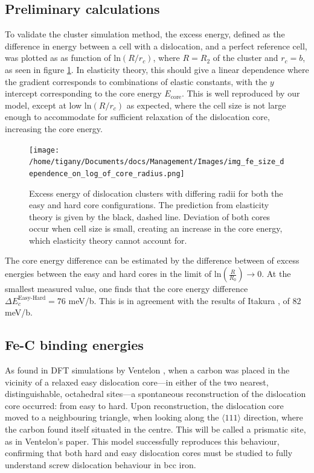\documentclass[a4paper,11pt]{article}
\begin{document}
\subsection{Preliminary calculations}
\label{sec:org8fcfa8a}


To validate the cluster simulation method, the excess energy, defined as the difference in energy
between a cell with a dislocation, and a perfect reference cell, was plotted as as function of
\(\text{ln}(R/r_c)\), where \(R = R_2\) of the cluster and \(r_c = b\), as seen in
figure \ref{lnrdep}. In elasticity theory, this should give a linear dependence where the gradient
corresponds to combinations of elastic constants, with the \(y\) intercept corresponding to the
core energy \(E_{\text{core}}\). This is well reproduced by our model, except at low \(\text{ln}(R/r_c)\)
as expected, where the cell size is not large enough to accommodate for sufficient relaxation of
the dislocation core, increasing the core energy.


\begin{figure}[htbp]
\centering
\texttt{[image: /home/tigany/Documents/docs/Management/Images/img\_fe\_size\_dependence\_on\_log\_of\_core\_radius.png]}
\caption{Excess energy of dislocation clusters with differing radii for both the easy and hard core configurations. The prediction from elasticity theory is given by the black, dashed line. Deviation of both cores occur when cell size is small, creating an increase in the core energy, which elasticity theory cannot account for. \label{lnrdep}}
\end{figure}




The core energy difference can be estimated by the difference between of excess energies between
the easy and hard cores in the limit of \(\text{ln}(\frac{R}{R_0}) \rightarrow 0\). At the smallest measured
value, one finds that the core energy difference \(\Delta E_c^{\text{Easy-Hard}} = 76\) meV/b. This is in
agreement with the results of Itakura \cite{Itakura2012}, of 82 meV/b.



\subsection{Fe-C binding energies}
\label{sec:org6067331}



As found in DFT simulations by Ventelon \cite{Ventelon2015}, when a carbon was placed in the
vicinity of a relaxed easy dislocation core---in either of the two nearest, distinguishable,
octahedral sites---a spontaneous reconstruction of the dislocation core occurred: from easy to
hard. Upon reconstruction, the dislocation core moved to a neighbouring triangle, when looking along the \(\langle
   111\rangle\) direction, where the carbon found itself situated in the centre. This will be called a
prismatic site, as in Ventelon's paper. This model successfully
reproduces this behaviour, confirming that both hard and easy dislocation cores must be studied
to fully understand screw dislocation behaviour in bcc iron. 
\end{document}
